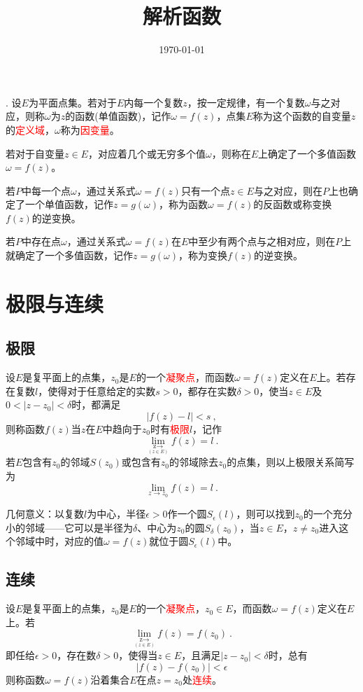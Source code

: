 \documentclass[12pt,a4paper]{article}
\title{解析函数}
\author{}
\date{\today}
\begin{document}
. 设$E$为平面点集。若对于$E$内每一个复数$z$，按一定规律，有一个复数$\omega$与之对应，则称$\omega$为$z$的函数(单值函数)，记作$\omega = f(z)$，点集$E$称为这个函数的自变量$z$的\textcolor{red}{定义域}，$\omega$称为\textcolor{red}{因变量}。

若对于自变量$z \in E$，对应着几个或无穷多个值$\omega$，则称在$E$上确定了一个多值函数$\omega = f(z)$。

若$P$中每一个点$\omega$，通过关系式$\omega = f(z)$只有一个点$z \in E$与之对应，则在$P$上也确定了一个单值函数，记作$z = g(\omega)$，称为函数$\omega = f(z)$的反函数或称变换$f(z)$的逆变换。

若$P$中存在点$\omega$，通过关系式$\omega = f(z)$在$E$中至少有两个点与之相对应，则在$P$上就确定了一个多值函数，记作$z = g(\omega)$，称为变换$f(z)$的逆变换。

\section{极限与连续}
\subsection{极限}
设$E$是复平面上的点集，$z_0$是$E$的一个\textcolor{red}{凝聚点}，而函数$\omega = f(z)$定义在$E$上。若存在复数$l$，使得对于任意给定的实数$s > 0$，都存在实数$\delta > 0$，使当$z \in E$及$0 < |z-z_0| < \delta$时，都满足
\begin{equation}
|f(z) -l| < s ~,
\end{equation}
则称函数$f(z)$当$z$在$E$中趋向于$z_0$时有\textcolor{red}{极限}$l$，记作
\begin{equation}
\underset{\mathop{z \rightarrow z_0}\limits_{(z \in E)}}{\lim} f(z) = l ~.
\end{equation}
若$E$包含有$z_0$的邻域$S(z_0)$或包含有$z_0$的邻域除去$z_0$的点集，则以上极限关系简写为
\begin{equation}
\underset{z \rightarrow z_0}{\lim}f(z) = l ~.
\end{equation}

几何意义：以复数$l$为中心，半径$\epsilon > 0$作一个圆$S_{\epsilon}(l)$，则可以找到$z_0$的一个充分小的邻域——它可以是半径为$\delta$、中心为$z_0$的圆$S_{\delta}(z_0)$，当$z\in E$，$z\neq z_0$进入这个邻域中时，对应的值$\omega = f(z)$就位于圆$S_{\epsilon}(l)$中。

\subsection{连续}
设$E$是复平面上的点集，$z_0$是$E$的一个\textcolor{red}{凝聚点}，$z_0\in E$，而函数$\omega = f(z)$定义在$E$上。若
\begin{equation}
\underset{\mathop{z \rightarrow z_0}\limits_{(z \in E)}}{\lim} f(z) = f(z_0) ~.
\end{equation}
即任给$\epsilon > 0$，存在数$\delta > 0$，使得当$z \in E$，且满足$|z-z_0| < \delta$时，总有
\begin{equation}
|f(z) -f(z_0)| < \epsilon
\end{equation}
则称函数$\omega = f(z)$沿着集合$E$在点$z=z_0$处\textcolor{red}{连续}。
\end{document}

